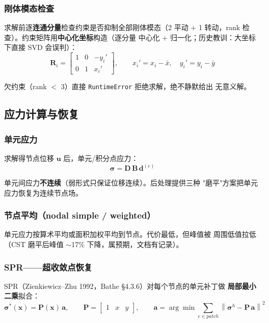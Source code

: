 \documentclass[12pt,a4paper]{ctexart}
\newcommand{\fem}{\Verb}
\begin{document}
\subsubsection{刚体模态检查}

求解前逐\textbf{连通分量}检查约束是否抑制全部刚体模态（2 平动 +
1 转动，rank 检查）。约束矩阵用\textbf{中心化坐标}构造（逐分量
中心化 + 归一化；历史教训：大坐标下直接 SVD 会误判）：
\begin{equation}
\mathbf{R}_i = \begin{bmatrix} 1 & 0 & -y_i' \\ 0 & 1 & x_i' \end{bmatrix},
\qquad
x_i' = x_i - \bar{x}, \quad y_i' = y_i - \bar{y}
\end{equation}

欠约束（rank $<$ 3）直接 \fem|RuntimeError| 拒绝求解，绝不静默给出
无意义解。

\subsection{应力计算与恢复}

\subsubsection{单元应力}

求解得节点位移 $\mathbf{u}$ 后，单元/积分点应力：
\begin{equation}
\boldsymbol{\sigma} = \mathbf{D}\,\mathbf{B}\,\mathbf{d}^{(e)}
\end{equation}

单元间应力\textbf{不连续}（弱形式只保证位移连续）。后处理提供三种
"磨平"方案把单元应力恢复为连续节点场。

\subsubsection{节点平均（nodal simple / weighted）}

单元应力按算术平均或面积加权平均到节点。代价最低，但峰值被
周围低值拉低（CST 磨平后峰值 $\sim$17\% 下降，属预期，文档有记录）。

\subsubsection{SPR——超收敛点恢复}

SPR（Zienkiewicz--Zhu 1992，Bathe §4.3.6）对每个节点的单元补丁做
\textbf{局部最小二乘}拟合：
\begin{equation}
\boldsymbol{\sigma}^*(\mathbf{x}) = \mathbf{P}(\mathbf{x})\,\mathbf{a},
\qquad \mathbf{P} = \begin{bmatrix} 1 & x & y \end{bmatrix},
\qquad \mathbf{a} = \arg\min \sum_{e \in patch} \left\| \boldsymbol{\sigma}^h - \mathbf{P}\,\mathbf{a} \right\|^2
\end{equation}
\end{document}
